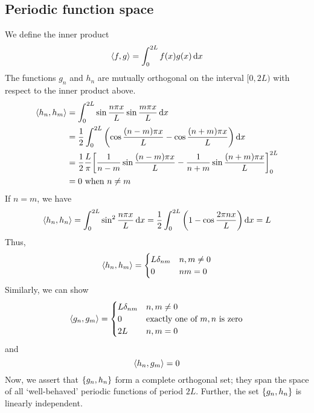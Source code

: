 \subsection{Periodic function space}
We define the inner product
\[
	\left\langle{f, g}\right\rangle = \int_0^{2L} f(x) g(x) \dd{x}
\]
The functions \( g_n \) and \( h_n \) are mutually orthogonal on the interval \( [0, 2L) \) with respect to the inner product above.
\begin{align*}
	\left\langle{h_n, h_m}\right\rangle & = \int_0^{2L} \sin \frac{n\pi x}{L} \sin \frac{m\pi x}{L} \dd{x}                                                           \\
	                 & = \frac{1}{2} \int_0^{2L} \qty(\cos\frac{(n-m)\pi x}{L} - \cos \frac{(n+m)\pi x}{L}) \dd{x}                                \\
	                 & = \frac{1}{2} \frac{L}{\pi} \qty[ \frac{1}{n-m}\sin\frac{(n-m)\pi x}{L} - \frac{1}{n+m} \sin \frac{(n+m)\pi x}{L} ]_0^{2L} \\
	                 & = 0 \text{ when } n \neq m
\end{align*}
If \( n = m \), we have
\[
	\left\langle{h_n, h_n}\right\rangle = \int_0^{2L} \sin^2 \frac{n\pi x}{L} \dd{x} = \frac{1}{2} \int_0^{2L} \qty(1-\cos \frac{2\pi n x}{L}) \dd{x} = L
\]
Thus,
\[
	\left\langle{h_n, h_m}\right\rangle = \begin{cases}
		L \delta_{nm} & n,m \neq 0 \\
		0             & nm = 0
	\end{cases}
\]
Similarly, we can show
\[
	\left\langle{g_n, g_m}\right\rangle = \begin{cases}
		L \delta_{nm} & n,m \neq 0                                 \\
		0             & \text{exactly one of } m,n \text{ is zero} \\
		2L            & n,m = 0
	\end{cases}
\]
and
\[
	\left\langle{h_n, g_m}\right\rangle = 0
\]
Now, we assert that \( \qty{g_n, h_n} \) form a complete orthogonal set; they span the space of all `well-behaved' periodic functions of period \( 2L \).
Further, the set \( \qty{g_n, h_n} \) is linearly independent.


